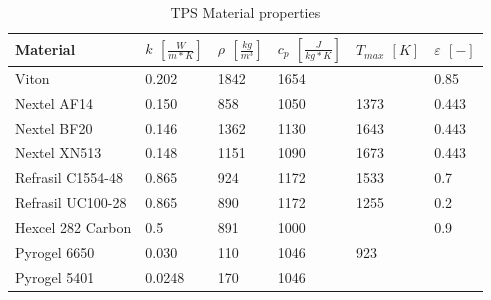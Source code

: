 \begin{table}[H]
\caption {TPS Material properties}
\centering
    \begin{tabular}{|l|l|l|l|l|l|}
    \hline
    \textbf{Material}         & \textbf{ $ k $ $ [ \frac{W}{m*K} ] $} & \textbf{ $ \rho $ $ [ \frac{kg}{m^3} ] $} & \textbf{  $ c_{p} $ $ [ \frac{J}{kg*K} ] $ }& \textbf{ $ T_{max} $ $ [ K ] $} &\textbf{ $ \varepsilon $ $ [ - ] $} \\[1.5ex] \hline \hline
     Viton       & 0.202 
& 1842 & 1654 
& 	 & 0.85
 \\ \hline
    Nextel AF14       & 0.150                                                 & 858                                        & 1050                                            & 1373	 & 0.443                                      \\ \hline
    Nextel BF20       & 0.146 
& 1362                                        & 1130 
& 1643	 & 0.443                                      
 \\ \hline
    Nextel XN513      & 0.148                                                 & 1151                                       & 1090                                            & 1673	 & 0.443                                      \\ \hline
    Refrasil C1554-48 & 0.865                                                 & 924                                        & 1172                                            & 1533	 & 0.7                                        \\ \hline
    Refrasil UC100-28 & 0.865                                                 & 890                                        & 1172                                            & 1255  & 0.2                                        \\ \hline
    Hexcel 282 Carbon & 0.5                                                   & 891                                        & 1000                                            & ~ 	 & 0.9                                        \\ \hline
    Pyrogel 6650      & 0.030                                                 & 110                                        & 1046                                            & 923    & ~                                          \\ \hline
    Pyrogel 5401      & 0.0248                                                & 170                                        & 1046                                            & ~  	 & ~                                          \\ \hline

\end{tabular}
\end{table}
